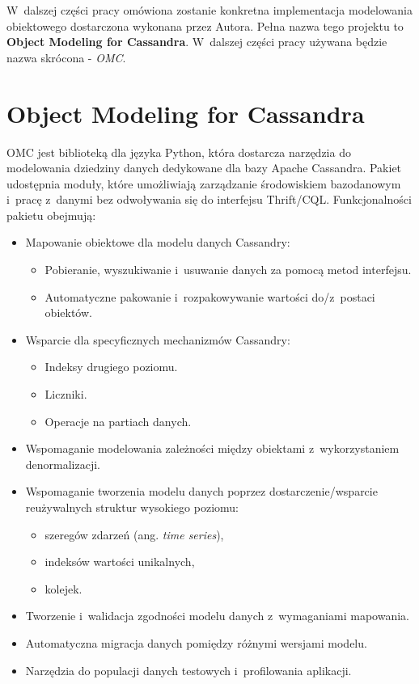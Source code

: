 W~dalszej części pracy omówiona zostanie konkretna implementacja modelowania obiektowego dostarczona wykonana przez Autora. Pełna nazwa tego projektu to \textbf{Object Modeling for Cassandra}. W~dalszej części pracy używana będzie nazwa skrócona - \emph{OMC}.

\section{Object Modeling for Cassandra}

OMC jest biblioteką dla języka Python, która dostarcza narzędzia do modelowania dziedziny danych dedykowane dla bazy Apache Cassandra. Pakiet udostępnia moduły, które umożliwiają zarządzanie środowiskiem bazodanowym i~pracę z~danymi bez odwoływania się do interfejsu Thrift/CQL. Funkcjonalności pakietu obejmują:

\begin{itemize}
	\item Mapowanie obiektowe dla modelu danych Cassandry:
		\begin{itemize}
			\item Pobieranie, wyszukiwanie i~usuwanie danych za pomocą metod interfejsu.
			\item Automatyczne pakowanie i~rozpakowywanie wartości do/z~postaci obiektów.
		\end{itemize}
	\item Wsparcie dla specyficznych mechanizmów Cassandry:
		\begin{itemize}
			\item Indeksy drugiego poziomu.
			\item Liczniki.
			\item Operacje na partiach danych.
		\end{itemize}
	\item Wspomaganie modelowania zależności między obiektami z~wykorzystaniem denormalizacji.
	\item Wspomaganie tworzenia modelu danych poprzez dostarczenie/wsparcie reużywalnych struktur wysokiego poziomu:
		\begin{itemize}
			\item szeregów zdarzeń (ang. \emph{time series}),
			\item indeksów wartości unikalnych,
			\item kolejek.
		\end{itemize}
	\item Tworzenie i~walidacja zgodności modelu danych z~wymaganiami mapowania.
	\item Automatyczna migracja danych pomiędzy różnymi wersjami modelu.
	\item Narzędzia do populacji danych testowych i~profilowania aplikacji. 
\end{itemize}

